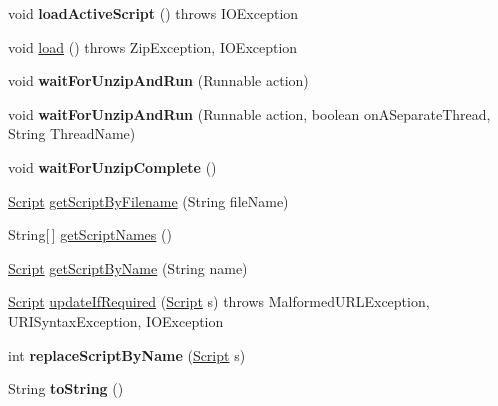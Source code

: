 \begin{DoxyCompactItemize}
\item 
\hypertarget{classCASUAL_1_1caspac_1_1Caspac_a3848e230c2ebe88fc4ab18d8cd72ef00}{void {\bfseries load\-Active\-Script} ()  throws I\-O\-Exception }\label{classCASUAL_1_1caspac_1_1Caspac_a3848e230c2ebe88fc4ab18d8cd72ef00}

\item 
void \hyperlink{classCASUAL_1_1caspac_1_1Caspac_a8dde0efbfc89cc5eba2a76bc29b2cd93}{load} ()  throws Zip\-Exception, I\-O\-Exception 
\item 
\hypertarget{classCASUAL_1_1caspac_1_1Caspac_a25eab75bfce4a2bae8fdba570cfd6058}{void {\bfseries wait\-For\-Unzip\-And\-Run} (Runnable action)}\label{classCASUAL_1_1caspac_1_1Caspac_a25eab75bfce4a2bae8fdba570cfd6058}

\item 
\hypertarget{classCASUAL_1_1caspac_1_1Caspac_ab4b478740128dbaa88b98c90355e5281}{void {\bfseries wait\-For\-Unzip\-And\-Run} (Runnable action, boolean on\-A\-Separate\-Thread, String Thread\-Name)}\label{classCASUAL_1_1caspac_1_1Caspac_ab4b478740128dbaa88b98c90355e5281}

\item 
\hypertarget{classCASUAL_1_1caspac_1_1Caspac_ae81bc5724a0bd3be2ab8883f318180c8}{void {\bfseries wait\-For\-Unzip\-Complete} ()}\label{classCASUAL_1_1caspac_1_1Caspac_ae81bc5724a0bd3be2ab8883f318180c8}

\item 
\hyperlink{classCASUAL_1_1caspac_1_1Script}{Script} \hyperlink{classCASUAL_1_1caspac_1_1Caspac_aaba95454fe20cc7b6c600f3a631866a6}{get\-Script\-By\-Filename} (String file\-Name)
\item 
String\mbox{[}$\,$\mbox{]} \hyperlink{classCASUAL_1_1caspac_1_1Caspac_a7faa66edaa415d62849653e520dce639}{get\-Script\-Names} ()
\item 
\hyperlink{classCASUAL_1_1caspac_1_1Script}{Script} \hyperlink{classCASUAL_1_1caspac_1_1Caspac_ace15ecf5d9e7e261161df7ea440d5cc5}{get\-Script\-By\-Name} (String name)
\item 
\hyperlink{classCASUAL_1_1caspac_1_1Script}{Script} \hyperlink{classCASUAL_1_1caspac_1_1Caspac_aef18425c5e00d5e2b3c4df0203a65e13}{update\-If\-Required} (\hyperlink{classCASUAL_1_1caspac_1_1Script}{Script} s)  throws Malformed\-U\-R\-L\-Exception, U\-R\-I\-Syntax\-Exception, I\-O\-Exception 
\item 
\hypertarget{classCASUAL_1_1caspac_1_1Caspac_a8d0624f21da3574c9c7b56d8be8528f9}{int {\bfseries replace\-Script\-By\-Name} (\hyperlink{classCASUAL_1_1caspac_1_1Script}{Script} s)}\label{classCASUAL_1_1caspac_1_1Caspac_a8d0624f21da3574c9c7b56d8be8528f9}

\item 
\hypertarget{classCASUAL_1_1caspac_1_1Caspac_a2f5a390c0f4f4e777fa5e2103bb8effa}{String {\bfseries to\-String} ()}\label{classCASUAL_1_1caspac_1_1Caspac_a2f5a390c0f4f4e777fa5e2103bb8effa}

\end{DoxyCompactItemize}

